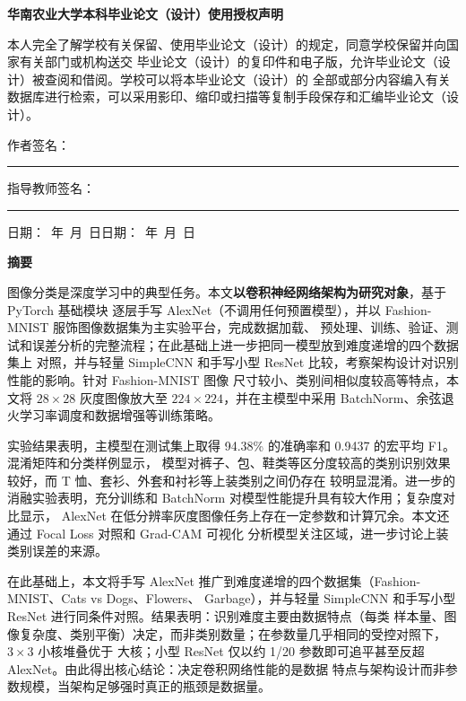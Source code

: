 \documentclass[12pt,a4paper,fontset=fandol]{ctexart}
\numberwithin{figure}{section}
\numberwithin{table}{section}
\numberwithin{equation}{section}
\begin{document}
\begin{center}{\large\bfseries 华南农业大学本科毕业论文（设计）使用授权声明}\end{center}
\vspace{0.5em}
\par 本人完全了解学校有关保留、使用毕业论文（设计）的规定，同意学校保留并向国家有关部门或机构送交
毕业论文（设计）的复印件和电子版，允许毕业论文（设计）被查阅和借阅。学校可以将本毕业论文（设计）的
全部或部分内容编入有关数据库进行检索，可以采用影印、缩印或扫描等复制手段保存和汇编毕业论文（设计）。
\vspace{1.2cm}
\par\hfill 作者签名：\rule{3cm}{0.4pt}\qquad 指导教师签名：\rule{3cm}{0.4pt}\hspace{1cm}
\par\hfill 日期：\quad\ 年\ \quad 月\ \quad 日\qquad\quad 日期：\quad\ 年\ \quad 月\ \quad 日\hspace{1cm}
\newpage
{}   %
\setcounter{page}{1}

\begin{center}{\Large\bfseries 摘\quad 要}\end{center}
\par 图像分类是深度学习中的典型任务。本文\textbf{以卷积神经网络架构为研究对象}，基于 PyTorch 基础模块
逐层手写 AlexNet（不调用任何预置模型），并以 Fashion-MNIST 服饰图像数据集为主实验平台，完成数据加载、
预处理、训练、验证、测试和误差分析的完整流程；在此基础上进一步把同一模型放到难度递增的四个数据集上
对照，并与轻量 SimpleCNN 和手写小型 ResNet 比较，考察架构设计对识别性能的影响。针对 Fashion-MNIST 图像
尺寸较小、类别间相似度较高等特点，本文将 $28\times28$ 灰度图像放大至 $224\times224$，并在主模型中采用
BatchNorm、余弦退火学习率调度和数据增强等训练策略。

\par 实验结果表明，主模型在测试集上取得 94.38\% 的准确率和 0.9437 的宏平均 F1。混淆矩阵和分类样例显示，
模型对裤子、包、鞋类等区分度较高的类别识别效果较好，而 T 恤、套衫、外套和衬衫等上装类别之间仍存在
较明显混淆。进一步的消融实验表明，充分训练和 BatchNorm 对模型性能提升具有较大作用；复杂度对比显示，
AlexNet 在低分辨率灰度图像任务上存在一定参数和计算冗余。本文还通过 Focal Loss 对照和 Grad-CAM 可视化
分析模型关注区域，进一步讨论上装类别误差的来源。

\par 在此基础上，本文将手写 AlexNet 推广到难度递增的四个数据集（Fashion-MNIST、Cats vs Dogs、Flowers、
Garbage），并与轻量 SimpleCNN 和手写小型 ResNet 进行同条件对照。结果表明：识别难度主要由数据特点（每类
样本量、图像复杂度、类别平衡）决定，而非类别数量；在参数量几乎相同的受控对照下，$3\times3$ 小核堆叠优于
大核；小型 ResNet 仅以约 1/20 参数即可追平甚至反超 AlexNet。由此得出核心结论：决定卷积网络性能的是数据
特点与架构设计而非参数规模，当架构足够强时真正的瓶颈是数据量。
\end{document}
